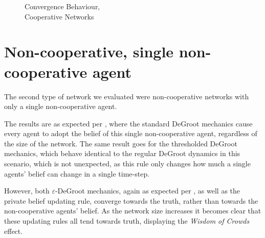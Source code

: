 \documentclass[a4paper, 12pt]{report}
\begin{document}
\begin{figure}[!htbp]
\begin{minipage}{.45\linewidth}
    \end{minipage}\par\medskip
    \centering
    
    \caption{Convergence Behaviour, \\ Cooperative Networks }
\end{figure}

\newpage

\section{Non-cooperative, single non-cooperative agent}
\label{results:noncoop1}
The second type of network we evaluated were non-cooperative networks with only a single non-cooperative agent.

\noindent The results are as expected per \cite{amir2021robust}, where the standard DeGroot mechanics cause every agent to adopt the belief of this single non-cooperative agent, regardless of the size of the network. The same result goes for the thresholded DeGroot mechanics, which behave identical to the regular DeGroot dynamics in this scenario, which is not unexpected, as this rule only changes how much a single agents' belief can change in a single time-step.

\noindent However, both $\varepsilon$-DeGroot mechanics, again as expected per \cite{amir2021robust}, as well as the private belief updating rule, converge towards the truth, rather than towards the non-cooperative agents' belief. As the network size increases it becomes clear that these updating rules all tend towards truth, displaying the \emph{Wisdom of Crowds} effect.
\end{document}
